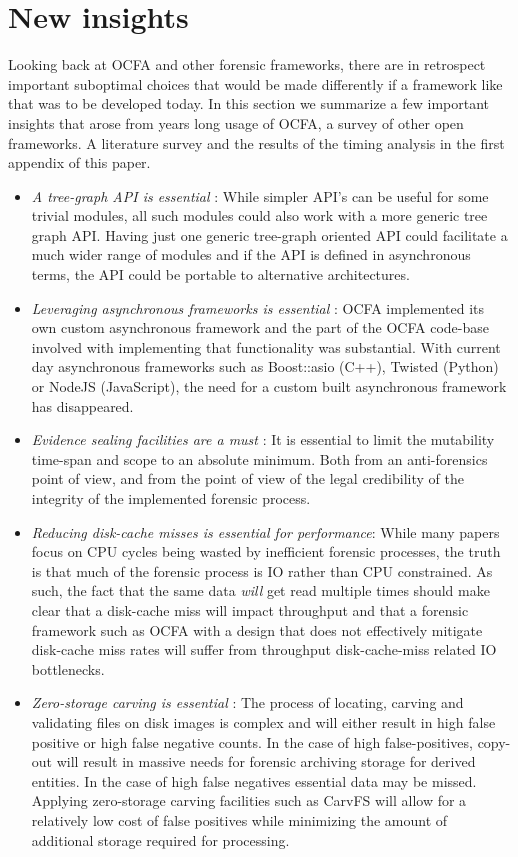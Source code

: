 \section{New insights}
Looking back at OCFA and other forensic frameworks, there are in retrospect important suboptimal choices that would be made differently if a framework like that was to be developed today. In this section we summarize a few important insights that arose from years long usage of OCFA, a survey of other open frameworks. A literature survey and the results of the timing analysis in the first appendix of this paper.
\begin{itemize}
\item \emph{A tree-graph API is essential} : While simpler API's can be useful for some trivial modules, all such modules could also work with a more generic tree graph API. Having just one generic tree-graph oriented API could facilitate a much wider range of modules and if the API is defined in asynchronous terms, the API could be portable to alternative architectures.
\item \emph{Leveraging asynchronous frameworks is essential} : OCFA implemented its own custom asynchronous framework and the part of the OCFA code-base involved with implementing that functionality was substantial. With current day asynchronous frameworks such as Boost::asio (C++), Twisted (Python) or NodeJS (JavaScript), the need for a custom built asynchronous framework has disappeared.
\item \emph{Evidence sealing facilities are a must} : It is essential to limit the mutability time-span and scope to an absolute minimum. Both from an anti-forensics point of view, and from the point of view of the legal credibility of the integrity of the implemented forensic process.
\item \emph{Reducing disk-cache misses is essential for performance}: While many papers focus on CPU cycles being wasted by inefficient forensic processes, the truth is that much of the forensic process is IO rather than CPU constrained. As such, the fact that the same data \emph{will} get read multiple times should make clear that a disk-cache miss will impact throughput and that a forensic framework such as OCFA with a design that does not effectively mitigate disk-cache miss rates will suffer from throughput disk-cache-miss related IO bottlenecks.
\item \emph{Zero-storage carving is essential} : The process of locating, carving and validating files on disk images is complex and will either result in high false positive or high false negative counts. In the case of high false-positives, copy-out will result in massive needs for forensic archiving storage for derived entities. In the case of high false negatives essential data may be missed. Applying zero-storage carving facilities such as CarvFS will allow for a relatively low cost of false positives while minimizing the amount of additional storage required for processing.

\end{itemize}

